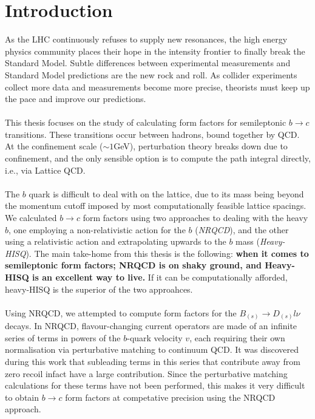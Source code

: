 \chapter{Introduction}
\label{sec:intro}

As the LHC continuously refuses to supply new resonances, the high energy physics community places their hope in the intensity frontier to finally break the Standard Model. Subtle differences between experimental measurements and Standard Model predictions are the new rock and roll. As collider experiments collect more data and measurements become more precise, theorists must keep up the pace and improve our predictions.
\\ \\
This thesis focuses on the study of calculating form factors for semileptonic $b\to c$ transitions. These transitions occur between hadrons, bound together by QCD. At the confinement scale ($\sim 1$GeV), perturbation theory breaks down due to confinement, and the only sensible option is to compute the path integral directly, i.e., via Lattice QCD.
\\ \\
The $b$ quark is difficult to deal with on the lattice, due to its mass being beyond the momentum cutoff imposed by most computationally feasible lattice spacings. We calculated $b\to c$ form factors using two approaches to dealing with the heavy $b$, one employing a non-relativistic action for the $b$ ({\textit{NRQCD}}), and the other using a relativistic action and extrapolating upwards to the $b$ mass ({\textit{Heavy-HISQ}}). The main take-home from this thesis is the following: {\textbf{when it comes to semileptonic form factors; NRQCD is on shaky ground, and Heavy-HISQ is an excellent way to live.}} If it can be computationally afforded, heavy-HISQ is the superior of the two approahces.
\\ \\
Using NRQCD, we attempted to compute form factors for the $B_{(s)}\to D_{(s)}l\nu$ decays. %
In NRQCD, flavour-changing current operators are made of an infinite series of terms in powers of the $b$-quark velocity $v$, each requiring their own normalisation via perturbative matching to continuum QCD. It was discovered during this work that subleading terms in this series that contribute away from zero recoil infact have a large contribution. Since the perturbative matching calculations for these terms have not been performed, this makes it very difficult to obtain $b\to c$ form factors at competative precision using the NRQCD approach.
